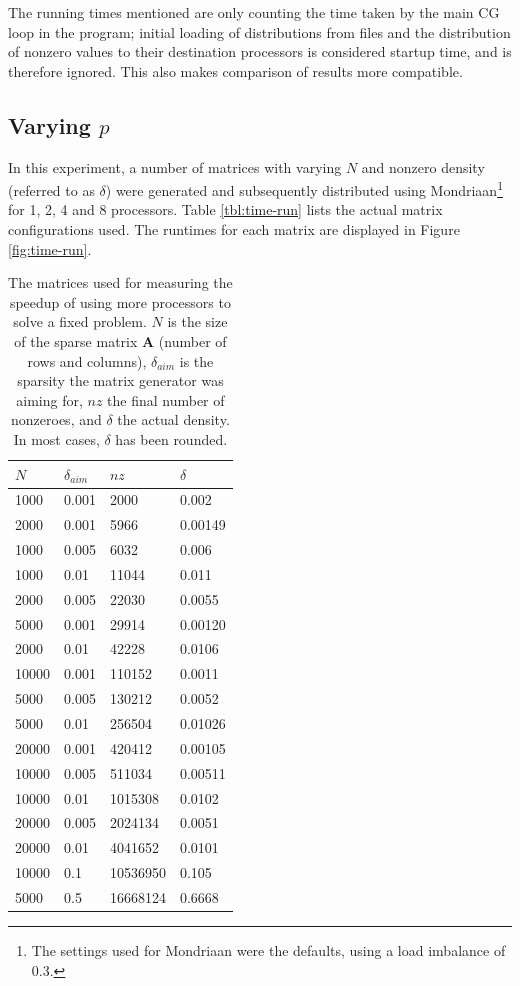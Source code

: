 \documentclass[a4paper]{article}
\newcommand{\mat}[1]{\ensuremath{\boldsymbol{#1}}}
\begin{document}
The running times mentioned are only counting the time taken by the main CG loop
in the program; initial loading of distributions from files and the distribution of
nonzero values to their destination processors is considered startup time, and is therefore
ignored. This also makes comparison of results more compatible.

\subsection{Varying $p$}\label{sec:time-run}

In this experiment, a number of matrices with varying $N$ and nonzero density (referred to as $\delta$) were generated and
subsequently distributed using Mondriaan\footnote{The settings used for Mondriaan
were the defaults, using a load imbalance of 0.3.} for 1, 2, 4 and 8 processors. Table \ref{tbl:time-run} lists the actual matrix configurations used. The runtimes for each matrix are displayed in Figure \ref{fig:time-run}.

\begin{table}
    \centering
    \begin{tabular}{l|l|l|l}
        $N$ & $\delta_{aim}$ & $nz$ & $\delta$ \\ \hline
1000  &  0.001   &   2000   &   0.002\\
2000  &  0.001   &   5966   &   0.00149\\
1000  &  0.005   &   6032   &   0.006\\
1000  &  0.01   &   11044   &   0.011\\
2000  &  0.005  &   22030   &   0.0055\\
5000  &  0.001   &   29914   &   0.00120\\
2000  &  0.01   &   42228   &   0.0106\\
10000  & 0.001    &   110152   &   0.0011\\
5000  &  0.005   &   130212   &   0.0052\\
5000  &  0.01  &   256504   &   0.01026\\
20000  & 0.001    &   420412   &   0.00105\\
10000  & 0.005   &   511034   &   0.00511\\
10000  & 0.01   &   1015308   &   0.0102\\
20000  & 0.005    &   2024134   &   0.0051\\
20000  & 0.01    &   4041652   &   0.0101\\
10000  & 0.1    &   10536950   &   0.105\\
5000  &  0.5   &   16668124   &   0.6668\\
    \end{tabular}
    \caption{The matrices used for measuring the speedup of using more processors to solve a fixed problem. $N$ is the size of the sparse matrix \mat A (number of rows and columns), $\delta_{aim}$ is the sparsity the matrix generator was aiming for, $nz$ the final number of nonzeroes, and $\delta$ the actual density. In most cases, $\delta$ has been rounded.}
    \label{tab:time-run}
\end{table}
\end{document}
